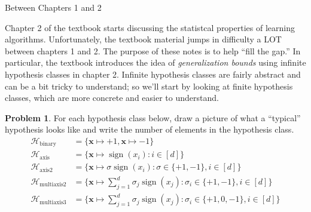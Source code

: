 \documentclass[10pt]{exam}
\theoremstyle{definition}
\newtheorem{problem}{Problem}
\DeclareMathOperator{\sign}{sign}
\newcommand{\x}{\mathbf x}
\newcommand{\lone}[1]{{\lVert {#1} \rVert}_1}
\newcommand{\ltwo}[1]{{\lVert {#1} \rVert}_2}
\newcommand{\lp}[1]{{\lVert {#1} \rVert}_p}
\newcommand{\HH}[1]{\mathcal H_{\text{#1}}}
\begin{document}
\begin{center}
{
\Huge
Between Chapters 1 and 2
}
\end{center}

\begin{center}
\end{center}

\noindent
Chapter 2 of the textbook starts discussing the statistcal properties of learning algorithms.
Unfortunately, the textbook material jumps in difficulty a LOT between chapters 1 and 2.
The purpose of these notes is to help ``fill the gap.''
In particular, the textbook introduces the idea of \emph{generalization bounds} using infinite hypothesis classes in chapter 2.
Infinite hypothesis classes are fairly abstract and can be a bit tricky to understand;
so we'll start by looking at finite hypothesis classes,
which are more concrete and easier to understand.



\begin{problem}
    For each hypothesis class below, draw a picture of what a ``typical'' hypothesis looks like and write the number of elements in the hypothesis class.
\begin{align*}
    \HH{binary} &= \bigg\{ \x \mapsto +1, \x \mapsto -1 \bigg\}\\
    \HH{axis} &= \bigg\{ \x \mapsto \sign(x_i) : i \in [d] \bigg\} \\
    \HH{axis2} &= \bigg\{ \x \mapsto \sigma\sign(x_i) : \sigma \in\{+1, -1\}, i \in [d] \bigg\} \\
    \HH{multiaxis2} &= \bigg\{ \x \mapsto \sum_{j=1}^d \sigma_j \sign(x_j) : \sigma_i \in \{+1, -1\}, i \in [d] \bigg\}  \\
    \HH{multiaxis3} &= \bigg\{ \x \mapsto \sum_{j=1}^d \sigma_j \sign(x_j) : \sigma_i \in \{+1, 0, -1\}, i \in [d] \bigg\}  \\
\end{align*}
\end{problem}
\end{document}
